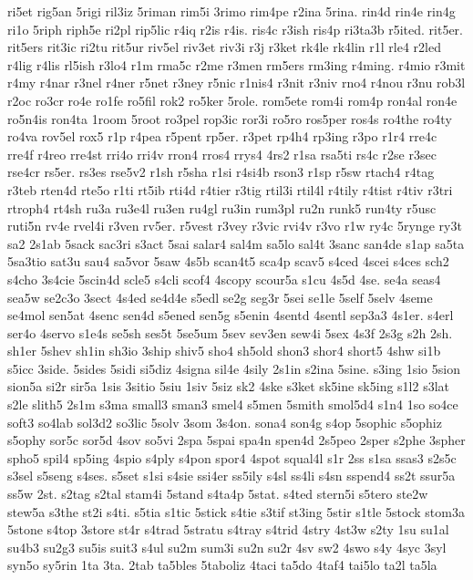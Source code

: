 {ri5et
rig5an
5rigi
ril3iz
5riman
rim5i
3rimo
rim4pe
r2ina
5rina.
rin4d
rin4e
rin4g
ri1o
5riph
riph5e
ri2pl
rip5lic
r4iq
r2is
r4is.
ris4c
r3ish
ris4p
ri3ta3b
r5ited.
rit5er.
rit5ers
rit3ic
ri2tu
rit5ur
riv5el
riv3et
riv3i
r3j
r3ket
rk4le
rk4lin
r1l
rle4
r2led
r4lig
r4lis
rl5ish
r3lo4
r1m
rma5c
r2me
r3men
rm5ers
rm3ing
r4ming.
r4mio
r3mit
r4my
r4nar
r3nel
r4ner
r5net
r3ney
r5nic
r1nis4
r3nit
r3niv
rno4
r4nou
r3nu
rob3l
r2oc
ro3cr
ro4e
ro1fe
ro5fil
rok2
ro5ker
5role.
rom5ete
rom4i
rom4p
ron4al
ron4e
ro5n4is
ron4ta
1room
5root
ro3pel
rop3ic
ror3i
ro5ro
ros5per
ros4s
ro4the
ro4ty
ro4va
rov5el
rox5
r1p
r4pea
r5pent
rp5er.
r3pet
rp4h4
rp3ing
r3po
r1r4
rre4c
rre4f
r4reo
rre4st
rri4o
rri4v
rron4
rros4
rrys4
4rs2
r1sa
rsa5ti
rs4c
r2se
r3sec
rse4cr
rs5er.
rs3es
rse5v2
r1sh
r5sha
r1si
r4si4b
rson3
r1sp
r5sw
rtach4
r4tag
r3teb
rten4d
rte5o
r1ti
rt5ib
rti4d
r4tier
r3tig
rtil3i
rtil4l
r4tily
r4tist
r4tiv
r3tri
rtroph4
rt4sh
ru3a
ru3e4l
ru3en
ru4gl
ru3in
rum3pl
ru2n
runk5
run4ty
r5usc
ruti5n
rv4e
rvel4i
r3ven
rv5er.
r5vest
r3vey
r3vic
rvi4v
r3vo
r1w
ry4c
5rynge
ry3t
sa2
2s1ab
5sack
sac3ri
s3act
5sai
salar4
sal4m
sa5lo
sal4t
3sanc
san4de
s1ap
sa5ta
5sa3tio
sat3u
sau4
sa5vor
5saw
4s5b
scan4t5
sca4p
scav5
s4ced
4scei
s4ces
sch2
s4cho
3s4cie
5scin4d
scle5
s4cli
scof4
4scopy
scour5a
s1cu
4s5d
4se.
se4a
seas4
sea5w
se2c3o
3sect
4s4ed
se4d4e
s5edl
se2g
seg3r
5sei
se1le
5self
5selv
4seme
se4mol
sen5at
4senc
sen4d
s5ened
sen5g
s5enin
4sentd
4sentl
sep3a3
4s1er.
s4erl
ser4o
4servo
s1e4s
se5sh
ses5t
5se5um
5sev
sev3en
sew4i
5sex
4s3f
2s3g
s2h
2sh.
sh1er
5shev
sh1in
sh3io
3ship
shiv5
sho4
sh5old
shon3
shor4
short5
4shw
si1b
s5icc
3side.
5sides
5sidi
si5diz
4signa
sil4e
4sily
2s1in
s2ina
5sine.
s3ing
1sio
5sion
sion5a
si2r
sir5a
1sis
3sitio
5siu
1siv
5siz
sk2
4ske
s3ket
sk5ine
sk5ing
s1l2
s3lat
s2le
slith5
2s1m
s3ma
small3
sman3
smel4
s5men
5smith
smol5d4
s1n4
1so
so4ce
soft3
so4lab
sol3d2
so3lic
5solv
3som
3s4on.
sona4
son4g
s4op
5sophic
s5ophiz
s5ophy
sor5c
sor5d
4sov
so5vi
2spa
5spai
spa4n
spen4d
2s5peo
2sper
s2phe
3spher
spho5
spil4
sp5ing
4spio
s4ply
s4pon
spor4
4spot
squal4l
s1r
2ss
s1sa
ssas3
s2s5c
s3sel
s5seng
s4ses.
s5set
s1si
s4sie
ssi4er
ss5ily
s4sl
ss4li
s4sn
sspend4
ss2t
ssur5a
ss5w
2st.
s2tag
s2tal
stam4i
5stand
s4ta4p
5stat.
s4ted
stern5i
s5tero
ste2w
stew5a
s3the
st2i
s4ti.
s5tia
s1tic
5stick
s4tie
s3tif
st3ing
5stir
s1tle
5stock
stom3a
5stone
s4top
3store
st4r
s4trad
5stratu
s4tray
s4trid
4stry
4st3w
s2ty
1su
su1al
su4b3
su2g3
su5is
suit3
s4ul
su2m
sum3i
su2n
su2r
4sv
sw2
4swo
s4y
4syc
3syl
syn5o
sy5rin
1ta
3ta.
2tab
ta5bles
5taboliz
4taci
ta5do
4taf4
tai5lo
ta2l
ta5la
}
